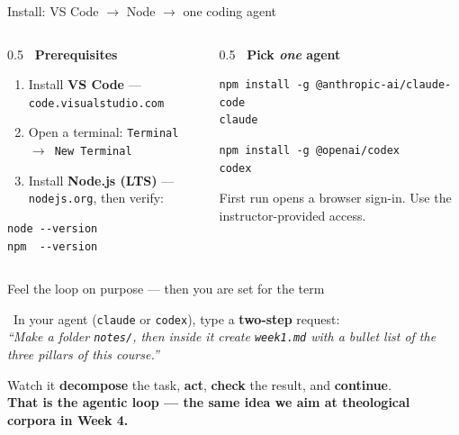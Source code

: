\begin{frame}[fragile]{Install: VS Code $\to$ Node $\to$ one coding agent}
  \begin{columns}[t, totalwidth=\textwidth]
    \begin{column}{0.5\textwidth}
      {\footnotesize\bfseries\color{accentblue}\faCheckCircle\ Prerequisites}
      \begin{enumerate}\footnotesize
        \item Install \textbf{VS Code} --- \texttt{code.visualstudio.com}
        \item Open a terminal: \texttt{Terminal $\to$ New Terminal}
        \item Install \textbf{Node.js (LTS)} --- \texttt{nodejs.org}, then verify:
      \end{enumerate}
      \begin{lstlisting}[style=shell]
node --version
npm  --version
      \end{lstlisting}
    \end{column}
    \begin{column}{0.5\textwidth}
      {\footnotesize\bfseries\color{cAgent}\faRobot\ Pick \emph{one} agent}
      \begin{lstlisting}[style=shell, title=Claude Code (Anthropic)]
npm install -g @anthropic-ai/claude-code
claude
      \end{lstlisting}
      \begin{lstlisting}[style=shell, title=Codex (OpenAI)]
npm install -g @openai/codex
codex
      \end{lstlisting}
      {\scriptsize\color{midgray} First run opens a browser sign-in. Use the
      instructor-provided access.}
    \end{column}
  \end{columns}
\end{frame}

\begin{frame}{Feel the loop on purpose --- then you are set for the term}
  \begin{calloutbox}[cAgent]
    \small\faTerminal\ In your agent (\texttt{claude} or \texttt{codex}), type a
    \textbf{two-step} request:\\[4pt]
    \textit{``Make a folder \texttt{notes/}, then inside it create
    \texttt{week1.md} with a bullet list of the three pillars of this course.''}
  \end{calloutbox}
  \vspace{10pt}
  \begin{center}\small
    Watch it \textbf{decompose} the task, \textbf{act}, \textbf{check} the
    result, and \textbf{continue}.\\[3pt]
    {\color{labnavy}\bfseries That is the agentic loop --- the same idea we aim
    at theological corpora in Week 4.}
  \end{center}
\end{frame}

